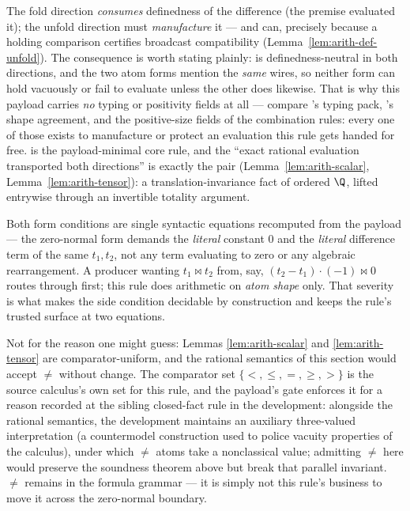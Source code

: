 \begin{bremark}
\label{rem:arith-asym}
The fold direction \emph{consumes} definedness of the difference (the
premise evaluated it); the unfold direction must \emph{manufacture} it
--- and can, precisely because a holding comparison certifies broadcast
compatibility (Lemma~\ref{lem:arith-def-unfold}). The consequence is
worth stating plainly:  is definedness-neutral in
both directions, and the two atom forms mention the \emph{same} wires,
so neither form can hold vacuously or fail to evaluate unless the other
does likewise. That is why this payload carries \emph{no} typing or
positivity fields at all --- compare 's typing pack,
's shape agreement, and the positive-size fields of the
combination rules: every one of those exists to manufacture or protect
an evaluation this rule gets handed for free.  is
the payload-minimal core rule, and the ``exact rational evaluation
transported both directions'' is exactly the pair
(Lemma~\ref{lem:arith-scalar}, Lemma~\ref{lem:arith-tensor}): a
translation-invariance fact of ordered $\Q$, lifted entrywise through an
invertible totality argument.
\end{bremark}

\begin{bremark}\label{rem:arith-pins}
Both form conditions are single syntactic equations recomputed from the
payload --- the zero-normal form demands the \emph{literal} constant $0$
and the \emph{literal} difference term of the same $t_1, t_2$, not any
term evaluating to zero or any algebraic rearrangement. A producer
wanting $t_1 \bowtie t_2$ from, say, $(t_2 - t_1) \cdot (-1) \bowtie 0$
routes through  first; this rule does arithmetic on
\emph{atom shape} only. That severity is what makes the side condition
decidable by construction and keeps the rule's trusted surface at two
equations.
\end{bremark}

\begin{bremark}\label{rem:arith-ne}
Not for the reason one might guess: Lemmas \ref{lem:arith-scalar} and
\ref{lem:arith-tensor} are comparator-uniform, and the rational
semantics of this section would accept $\neq$ without change. The
comparator set $\{<, \leq, =, \geq, >\}$ is the source calculus's own
set for this rule, and the payload's gate enforces it for a reason
recorded at the sibling closed-fact rule in the development: alongside
the rational semantics, the development maintains an auxiliary
three-valued interpretation (a countermodel construction used to police
vacuity properties of the calculus), under which $\neq$ atoms take a
nonclassical value; admitting $\neq$ here would preserve the soundness
theorem above but break that parallel invariant. $\neq$ remains in the
formula grammar --- it is simply not this rule's business to move it
across the zero-normal boundary.
\end{bremark}

